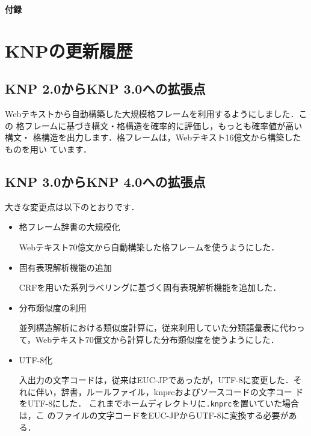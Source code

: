 \documentclass[a4j,11pt,titlepage]{jarticle}
\begin{document}
\noindent
{\LARGE\bf 付録}

\appendix

\section{KNPの更新履歴}

\subsection{KNP 2.0からKNP 3.0への拡張点}

Webテキストから自動構築した大規模格フレームを利用するようにしました．この
格フレームに基づき構文・格構造を確率的に評価し，もっとも確率値が高い構文・
格構造を出力します．格フレームは，Webテキスト16億文から構築したものを用い
ています．


\subsection{KNP 3.0からKNP 4.0への拡張点}

大きな変更点は以下のとおりです．
\begin{itemize}
 \item 格フレーム辞書の大規模化

       Webテキスト70億文から自動構築した格フレームを使うようにした．

 \item 固有表現解析機能の追加

       CRFを用いた系列ラベリングに基づく固有表現解析機能を追加した．

 \item 分布類似度の利用

       並列構造解析における類似度計算に，従来利用していた分類語彙表に代わっ
       て，Webテキスト70億文から計算した分布類似度を使うようにした．

 \item UTF-8化

       入出力の文字コードは，従来はEUC-JPであったが，UTF-8に変更した．そ
       れに伴い，辞書，ルールファイル，knprcおよびソースコードの文字コー
       ドをUTF-8にした．
       これまでホームディレクトリに\texttt{.knprc}を置いていた場合は，こ
       のファイルの文字コードをEUC-JPからUTF-8に変換する必要がある．
\end{itemize}
\end{document}
